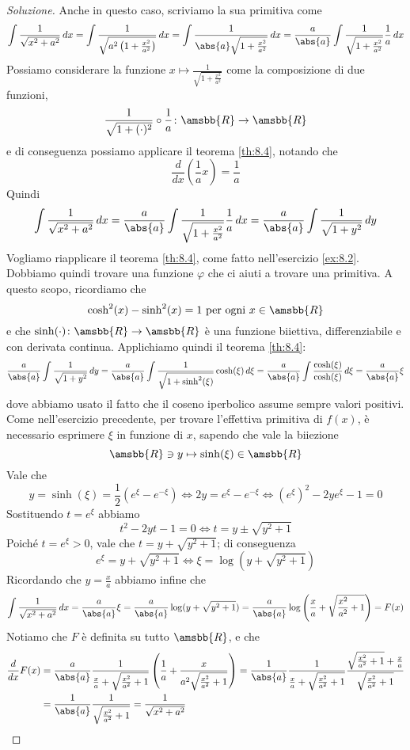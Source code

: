 \begin{proof}[Soluzione]
    Anche in questo caso, scriviamo la sua primitiva come
    \[
    \int \frac{1}{\sqrt{x^2+a^2}}\, dx = \int \frac{1}{\sqrt{a^2\left(1+\frac{x^2}{a^2}\right)}}\, dx = \int \frac{1}{\abs{a}\sqrt{1+\frac{x^2}{a^2}}}\, dx = \frac{a}{\abs{a}}\int \frac{1}{\sqrt{1+\frac{x^2}{a^2}}}\frac{1}{a}\, dx 
    \]
    Possiamo considerare la funzione $x\mapsto \frac{1}{\sqrt{1+\frac{x^2}{a^2}}}$ come la composizione di due funzioni,
    \[
    \frac{1}{\sqrt{1+(\cdot)^2}} \circ \frac{1}{a} \colon \amsbb{R}\to \amsbb{R}
    \]
    e di conseguenza possiamo applicare il teorema \ref{th:8.4}, notando che 
    \[
    \frac{d}{dx}\left(\frac{1}{a}x\right) = \frac{1}{a}
    \]
    Quindi
    \[
    \int \frac{1}{\sqrt{x^2+a^2}}\, dx = \frac{a}{\abs{a}}\int \frac{1}{\sqrt{1+\frac{x^2}{a^2}}}\frac{1}{a}\, dx = \frac{a}{\abs{a}}\int \frac{1}{\sqrt{1+y^2}}\, dy
    \]
    Vogliamo riapplicare il teorema \ref{th:8.4}, come fatto nell'esercizio \ref{ex:8.2}. Dobbiamo quindi trovare una funzione $\varphi$ che ci aiuti a trovare una primitiva. A questo scopo, ricordiamo che
    \[
    \cosh^2(x)-\sinh^2(x) = 1 \ \text{per ogni} \ x\in\amsbb{R}
    \]
    e che $\sinh(\cdot)\colon \amsbb{R} \to \amsbb{R}$ è una funzione biiettiva, differenziabile e con derivata continua. Applichiamo quindi il teorema \ref{th:8.4}:
    \[
    \frac{a}{\abs{a}}\int \frac{1}{\sqrt{1+y^2}}\, dy = \frac{a}{\abs{a}}\int \frac{1}{\sqrt{1+\sinh^2(\xi)}}\cosh(\xi)\, d\xi = \frac{a}{\abs{a}}\int \frac{\cosh(\xi)}{\cosh(\xi)}\, d\xi = \frac{a}{\abs{a}}\xi
    \]
    dove abbiamo usato il fatto che il coseno iperbolico assume sempre valori positivi.\\
    Come nell'esercizio precedente, per trovare l'effettiva primitiva di $f(x)$, è necessario esprimere $\xi$ in funzione di $x$, sapendo che vale la biiezione
    \[
    \amsbb{R}\ni y \mapsto \sinh(\xi)\in\amsbb{R}
    \]
    Vale che
    \[
    y = \sinh(\xi) = \frac{1}{2}(e^{\xi}-e^{-\xi}) \iff 2y = e^\xi - e^{-\xi} \iff (e^\xi)^2 -2y e^{\xi}-1 = 0
    \]
    Sostituendo $t=e^\xi$ abbiamo
    \[
    t^2 -2yt -1 = 0 \iff t =y\pm\sqrt{y^2+1}
    \]
    Poiché $t=e^\xi>0$, vale che $t = y+\sqrt{y^2+1}$; di conseguenza
    \[
    e^\xi = y+\sqrt{y^2+1} \iff \xi = \log(y+\sqrt{y^2+1})
    \]
    Ricordando che $y=\frac{x}{a}$ abbiamo infine che
    \[
    \int \frac{1}{\sqrt{x^2+a^2}}\, dx = \frac{a}{\abs{a}}\xi = \frac{a}{\abs{a}}\log(y+\sqrt{y^2+1}) = \frac{a}{\abs{a}}\log\left(\frac{x}{a}+\sqrt{\frac{x^2}{a^2}+1}\right) = F(x)
    \]
    Notiamo che $F$ è definita su tutto $\amsbb{R}$, e che
    \[
    \begin{split}
        \frac{d}{dx}F(x) & = \frac{a}{\abs{a}}\frac{1}{\frac{x}{a}+\sqrt{\frac{x^2}{a^2}+1}}\left(\frac{1}{a}+\frac{x}{a^2\sqrt{\frac{x^2}{a^2}+1}}\right) = \frac{1}{\abs{a}}\frac{1}{\frac{x}{a}+\sqrt{\frac{x^2}{a^2}+1}}\frac{\sqrt{\frac{x^2}{a^2}+1}+\frac{x}{a}}{\sqrt{\frac{x^2}{a^2}+1}}\\
        & = \frac{1}{\abs{a}}\frac{1}{\sqrt{\frac{x^2}{a^2}+1}} = \frac{1}{\sqrt{x^2+a^2}}
    \end{split}
    \]
\end{proof}

